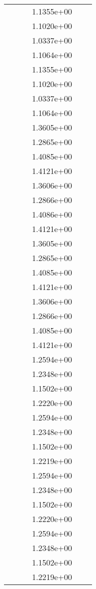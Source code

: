 \begin{xltabular}{\textwidth}{r|rS[table-format=1.3e+2]S[table-format=1.4e+2]S[table-format=1.4e+2]S[table-format=-1.5]}
&  &  & 1.1355e+00 & & \\
&  &  & 1.1020e+00 & & \\
&  &  & 1.0337e+00 & & \\
&  &  & 1.1064e+00 & & \\
&  &  & 1.1355e+00 & & \\
&  &  & 1.1020e+00 & & \\
&  &  & 1.0337e+00 & & \\
&  &  & 1.1064e+00 & & \\
&  &  & 1.3605e+00 & & \\
&  &  & 1.2865e+00 & & \\
&  &  & 1.4085e+00 & & \\
&  &  & 1.4121e+00 & & \\
&  &  & 1.3606e+00 & & \\
&  &  & 1.2866e+00 & & \\
&  &  & 1.4086e+00 & & \\
&  &  & 1.4121e+00 & & \\
&  &  & 1.3605e+00 & & \\
&  &  & 1.2865e+00 & & \\
&  &  & 1.4085e+00 & & \\
&  &  & 1.4121e+00 & & \\
&  &  & 1.3606e+00 & & \\
&  &  & 1.2866e+00 & & \\
&  &  & 1.4085e+00 & & \\
&  &  & 1.4121e+00 & & \\
&  &  & 1.2594e+00 & & \\
&  &  & 1.2348e+00 & & \\
&  &  & 1.1502e+00 & & \\
&  &  & 1.2220e+00 & & \\
&  &  & 1.2594e+00 & & \\
&  &  & 1.2348e+00 & & \\
&  &  & 1.1502e+00 & & \\
&  &  & 1.2219e+00 & & \\
&  &  & 1.2594e+00 & & \\
&  &  & 1.2348e+00 & & \\
&  &  & 1.1502e+00 & & \\
&  &  & 1.2220e+00 & & \\
&  &  & 1.2594e+00 & & \\
&  &  & 1.2348e+00 & & \\
&  &  & 1.1502e+00 & & \\
&  &  & 1.2219e+00 & & \\

\end{xltabular}
